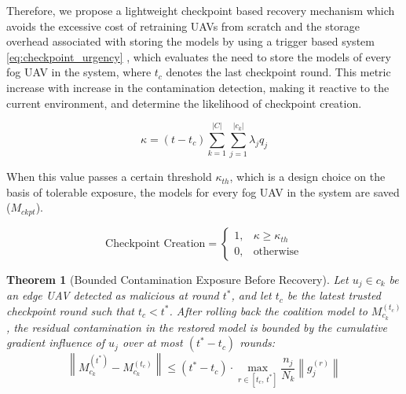 \documentclass[10pt,journal,compsoc]{IEEEtran}
\newtheorem{theorem}{Theorem}
\begin{document}
Therefore, we propose a lightweight checkpoint based recovery mechanism which avoids the excessive cost of retraining UAVs from scratch and the storage overhead associated with storing the models by using a trigger based system \eqref{eq:checkpoint_urgency} , which evaluates the need to store the models of every fog UAV in the system, where $t_c$ denotes the last checkpoint round. This metric increase with increase in the contamination detection, making it reactive to the current environment, and  determine the likelihood of checkpoint creation.

\begin{equation}\label{eq:checkpoint_urgency}
\kappa 
= 
(t - t_c)
\sum_{k = 1}^{|C|}\sum_{j=1}^{|c_k|}
\lambda_j
q_j
\end{equation}

When this value passes a certain threshold $\kappa_{th}$, which is a design choice on the basis of tolerable exposure, the models for every fog UAV in the system are saved ($M_{ckpt}$).

\begin{equation}\label{eq:checkpoint_trigger}
\text{Checkpoint Creation}
=
\begin{cases}
1, & \kappa \geq \kappa_{th}\\
0, & \text{otherwise}
\end{cases}
\end{equation}


\begin{theorem}[Bounded Contamination Exposure Before Recovery]
Let $u_j \in c_k$ be an edge UAV detected as malicious at round $t^*$, and let $t_c$ be the latest trusted checkpoint round such that $t_c < t^*$. After rolling back the coalition model to $M_{c_k}^{(t_c)}$, the residual contamination in the restored model is bounded by the cumulative gradient 
influence of $u_j$ over at most $(t^* - t_c)$ rounds:
\[
\left\| M_{c_k}^{(t^*)} - M_{c_k}^{(t_c)} \right\| 
\leq 
(t^* - t_c) \cdot \max_{r \in [t_c,\, t^*]} 
\frac{n_j}{N_k} \left\| g_j^{(r)} \right\|
\]
\end{theorem}
\end{document}
